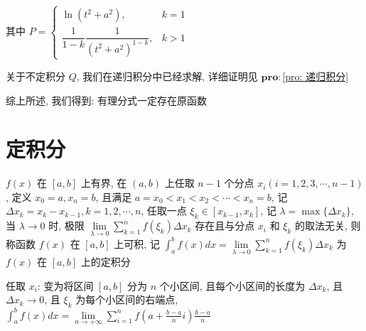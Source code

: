 \begin{theorem}
	其中 $P = \begin{cases} \ln(t^{2}+a^{2}), &k=1 \\ \dfrac{1}{1-k}\dfrac{1}{(t^{2}+a^{2})^{1-k}}, &k > 1  \end{cases}$

	关于不定积分 $Q$, 我们在递归积分中已经求解, 详细证明见 $\mathbf{pro:}$\ref{pro: 递归积分}

	综上所述, 我们得到: 有理分式一定存在原函数
\end{theorem}
\section{定积分}
\begin{definition}[定积分]
	$f(x)$ 在 $[a,b]$ 上有界, 在 $(a,b)$ 上任取 $n-1$ 个分点 $x_{i}(i = 1,2,3,\cdots,n-1)$, 定义 $x_{0} = a, x_{n} = b$, 且满足 $a = x_{0} < x_{1}<x_{2}<\cdots<x_{n} = b$, 记 $\Delta x_{k}=x_{k}-x_{k-1},k=1,2,\cdots,n$, 任取一点 $\xi_{k}\in[x_{k-1},x_{k}]$, 
	记 $\lambda = \max\{\Delta x_{k}\}$, 当 $\lambda\to 0$ 时, 极限 $\lim\limits_{\lambda\to 0}\sum\limits_{k=1}^{n}f(\xi_{k})\Delta x_{k}$ 存在且与分点 $x_{i}$ 和 $\xi_{k}$ 的取法无关, 
	则称函数 $f(x)$ 在 $[a,b]$ 上可积, 记 $\int_{a}^{b}f(x)dx = \lim\limits_{\lambda\to 0}\sum\limits_{k=1}^{n}f(\xi_{k})\Delta x_{k}$ 为 $f(x)$ 在 $[a,b]$ 上的定积分

	任取 $x_{i}$: 变为将区间 $[a,b]$ 分为 $n$ 个小区间, 且每个小区间的长度为 $\Delta x_{k}$, 且 $\Delta x_{k}\to 0$, 且 $\xi_{k}$ 为每个小区间的右端点, $\int_{a}^{b}f(x)dx = \lim\limits_{n\to +\infty}\sum\limits_{i=1}^{n}f(a+\frac{b-a}{n}i)\frac{b-a}{n}$
\end{definition}


